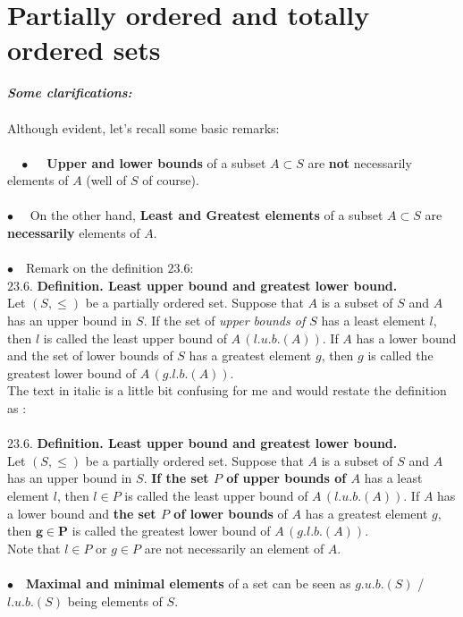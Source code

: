 \section{Partially ordered and totally ordered sets}
\textit{\textbf{Some clarifications:}}\\\\
Although evident, let's recall some basic remarks:\\\\
$\quad\bullet\quad$ \textbf{Upper and lower bounds} of a subset $A\subset S$ are \textbf{not} necessarily elements of $A$ (well of $S$ of course).\\\\
$\bullet\quad$ On the other hand, \textbf{Least  and Greatest elements}  of a subset $A\subset S$ are \textbf{necessarily} elements of $A$.\\\\
$\bullet\quad$Remark on the definition $\mathbf{23.6}$:\\
$\mathbf{23.6.}$ \textbf{Definition. Least upper bound and greatest lower bound. }\\
Let $(S,\leq)$ be a partially ordered set. Suppose that $A$ is a subset of $S$ and $A$ has an upper bound in $S$. If the set of \textit{upper bounds of $S$ }has a least element $l$, then $l$ is called the least upper bound of $A\, (l.u.b.(A))$. If $A$ has a lower bound and the set of lower bounds of $S$ has a greatest element $g$, then $g$ is called the greatest lower bound of $A\, (g.l.b. (A))$. \\
The text in italic is a little bit confusing for me and would restate the definition as :\\\\
$\mathbf{23.6.}$ \textbf{Definition. Least upper bound and greatest lower bound. }\\
Let $(S,\leq)$ be a partially ordered set. Suppose that $A$ is a subset of $S$ and $A$ has an upper bound in $S$. \textbf{If the set $P$ of upper bounds of $A$} has a least element $l$, then \textbf{$l\in P$} is called the least upper bound of $A\, (l.u.b.(A))$. If $A$ has a lower bound and \textbf{the set $P$ of lower bounds} of $A$ has a greatest element $g$, then $\mathbf{g\in P}$ is called the greatest lower bound of $A\, (g.l.b. (A))$. \\
Note that $l\in P$ or $g\in P$ are not necessarily an element of $A$.\\\\
$\bullet\quad$\textbf{Maximal and minimal elements} of a set can be seen as $g.u.b.(S)$ / $l.u.b.(S)$ being elements of $S$.
